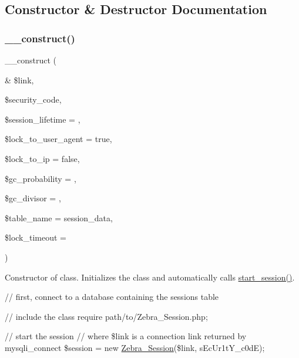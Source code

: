 \subsection{Constructor \& Destructor Documentation}
\mbox{\label{class_zebra___session_ad455e02743bbe3986d80650f417bd206}} 
\subsubsection{\texorpdfstring{\+\_\+\+\_\+construct()}{\_\_construct()}}
{\footnotesize\ttfamily \+\_\+\+\_\+construct (\begin{DoxyParamCaption}\item[{\&}]{\$link,  }\item[{}]{\$security\+\_\+code,  }\item[{}]{\$session\+\_\+lifetime = {\ttfamily \textquotesingle{}\textquotesingle{}},  }\item[{}]{\$lock\+\_\+to\+\_\+user\+\_\+agent = {\ttfamily true},  }\item[{}]{\$lock\+\_\+to\+\_\+ip = {\ttfamily false},  }\item[{}]{\$gc\+\_\+probability = {\ttfamily \textquotesingle{}\textquotesingle{}},  }\item[{}]{\$gc\+\_\+divisor = {\ttfamily \textquotesingle{}\textquotesingle{}},  }\item[{}]{\$table\+\_\+name = {\ttfamily \textquotesingle{}session\+\_\+data\textquotesingle{}},  }\item[{}]{\$lock\+\_\+timeout = {} }\end{DoxyParamCaption})}

Constructor of class. Initializes the class and automatically calls \mbox{\hyperlink{}{start\+\_\+session()}}.

{\ttfamily  // first, connect to a database containing the sessions table}

{\ttfamily // include the class require \textquotesingle{}path/to/\+Zebra\+\_\+\+Session.\+php\textquotesingle{};}

{\ttfamily // start the session // where \$link is a connection link returned by mysqli\+\_\+connect \$session = new \mbox{\hyperlink{class_zebra___session}{Zebra\+\_\+\+Session}}(\$link, \textquotesingle{}s\+Ec\+Ur1t\+Y\+\_\+c0dE\textquotesingle{}); }

